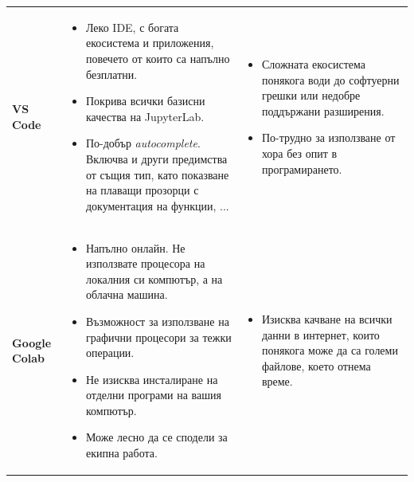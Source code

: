 \documentclass[11pt, a4paper]{article}
\begin{document}
\begin{table}[htbp]
\begin{tabular}{p{} p{} p{}}
\textbf{VS Code} & 
\begin{itemize}[leftmargin=*, nosep, before=\vspace{-0.5\baselineskip}]
    \item Леко IDE, с богата екосистема и приложения, повечето от които са напълно безплатни.
    \item Покрива всички базисни качества на JupyterLab.
    \item По-добър \textit{autocomplete}. Включва и други предимства от същия тип, като показване на плаващи прозорци с документация на функции, ...
\end{itemize} & 
\begin{itemize}[leftmargin=*, nosep, before=\vspace{-0.5\baselineskip}]
    \item Сложната екосистема понякога води до софтуерни грешки или недобре поддържани разширения.
    \item По-трудно за използване от хора без опит в програмирането.
\end{itemize} \\
\addlinespace[1em]

\textbf{Google Colab} & 
\begin{itemize}[leftmargin=*, nosep, before=\vspace{-0.5\baselineskip}]
    \item Напълно онлайн. Не използвате процесора на локалния си компютър, а на облачна машина.
    \item Възможност за използване на графични процесори за тежки операции.
    \item Не изисква инсталиране на отделни програми на вашия компютър.
    \item Може лесно да се сподели за екипна работа.
\end{itemize} & 
\begin{itemize}[leftmargin=*, nosep, before=\vspace{-0.5\baselineskip}]
    \item Изисква качване на всички данни в интернет, които понякога може да са големи файлове, което отнема време.
\end{itemize} \\
\bottomrule
\end{tabular}
\end{table}
\end{document}
